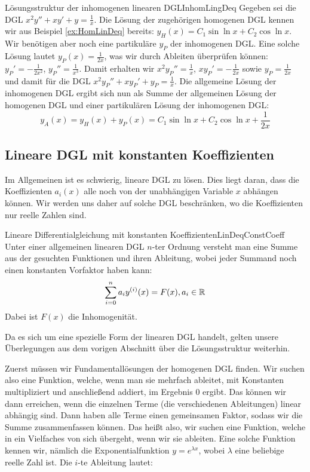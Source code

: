 \begin{example}{Lösungsstruktur der inhomogenen linearen DGL}{InhomLingDeq}
    Gegeben sei die DGL $x^2y''+xy'+y=\frac{1}{x}$. Die Lösung der zugehörigen homogenen DGL kennen wir aus Beispiel \ref{ex:HomLinDeq} bereits: $y_H(x) = C_1 \sin\ln x + C_2 \cos\ln x$. Wir benötigen aber noch eine partikuläre $y_P$ der inhomogenen DGL. Eine solche Lösung lautet $y_P(x) = \frac{1}{2x}$, was wir durch Ableiten überprüfen können: $y_P' = -\frac{1}{2x^2}$, $y_P'' = \frac{1}{x^3}$. Damit erhalten wir $x^2 y_P'' = \frac{1}{x}$, $x y_P' = -\frac{1}{2x}$ sowie $y_P = \frac{1}{2x}$ und damit für die DGL $x^2y_P''+xy_P'+y_P=\frac{1}{x}$. Die allgemeine Lösung der inhomogenen DGL ergibt sich nun als Summe der allgemeinen Lösung der homogenen DGL und einer partikulären Lösung der inhomogenen DGL:
    $$
        y_A(x) = y_H(x) + y_P(x) = C_1 \sin\ln x + C_2 \cos\ln x + \frac{1}{2x}
    $$
\end{example}

\subsection{Lineare DGL mit konstanten Koeffizienten}

Im Allgemeinen ist es schwierig, lineare DGL zu lösen. Dies liegt daran, dass die Koeffizienten $a_i(x)$ alle noch von der unabhängigen Variable $x$ abhängen können. Wir werden uns daher auf solche DGL beschränken, wo die Koeffizienten nur reelle Zahlen sind.

\begin{definition}{Lineare Differentialgleichung mit konstanten Koeffizienten}{LinDeqConstCoeff}
    Unter einer allgemeinen linearen DGL $n$-ter Ordnung versteht man eine Summe aus der gesuchten Funktionen und ihren Ableitung, wobei jeder Summand noch einen konstanten Vorfaktor haben kann:
    $$
        \sum\limits_{i=0}^n a_i y^{(i)}(x) = F(x), a_i \in \mathbb{R}
    $$
    Dabei ist $F(x)$ die Inhomogenität.
\end{definition}

Da es sich um eine spezielle Form der linearen DGL handelt, gelten unsere Überlegungen aus dem vorigen Abschnitt über die Lösungsstruktur weiterhin.

Zuerst müssen wir Fundamentallösungen der homogenen DGL finden. Wir suchen also eine Funktion, welche, wenn man sie mehrfach ableitet, mit Konstanten multipliziert und anschließend addiert, im Ergebnis $0$ ergibt. Das können wir dann erreichen, wenn die einzelnen Terme (die verschiedenen Ableitungen) linear abhängig sind. Dann haben alle Terme einen gemeinsamen Faktor, sodass wir die Summe zusammenfassen können. Das heißt also, wir suchen eine Funktion, welche in ein Vielfaches von sich übergeht, wenn wir sie ableiten. Eine solche Funktion kennen wir, nämlich die Exponentialfunktion $y=e^{\lambda x}$, wobei $\lambda$ eine beliebige reelle Zahl ist. Die $i$-te Ableitung lautet:

